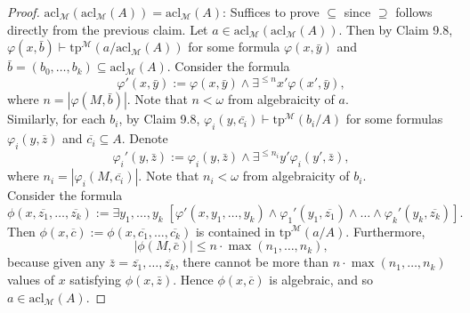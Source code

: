 \documentclass{article}
\begin{document}
\begin{enumerate}[label={\bf Q\arabic*:}]
\begin{proof}
      $\text{acl}_\mathcal{M}(\text{acl}_\mathcal{M}(A))
      =\text{acl}_\mathcal{M}(A)$: Suffices to prove $\subseteq$ since
      $\supseteq$ follows directly from the previous claim. Let
      $a\in\text{acl}_\mathcal{M}(\text{acl}_\mathcal{M}(A))$. Then by
      Claim 9.8, $\varphi(x,\bar{b})\vdash
      \text{tp}^{\mathcal{M}}(a/\text{acl}_\mathcal{M}(A))$ for some
      formula $\varphi(x,\bar{y})$ and $\bar{b}=(b_0,\ldots,b_k)\subseteq
      \text{acl}_\mathcal{M}(A)$. Consider the formula
      \[\varphi'(x,\bar{y}):= \varphi(x,\bar{y})\wedge \exists^{\leq
      n} x'\varphi(x',\bar{y}),\] where
      $n=|\varphi(M,\bar{b})|$. Note that $n<\omega$ from algebraicity of
      $a$. \\

      Similarly, for each $b_i$, by Claim
      9.8, $\varphi_i(y,\bar{c_i})\vdash \text{tp}^{\mathcal{M}}(b_i/A)$
      for some formulas $\varphi_i(y,\overline{z})$ and
      $\overline{c_i}\subseteq A$. Denote
      \[\varphi_i'(y,\bar{z}):= \varphi_i(y,\bar{z})\wedge \exists^{\leq
      n_i} y'\varphi_i(y',\bar{z}),\] where
      $n_i=|\varphi_i(M,\overline{c_i})|$. Note that $n_i<\omega$ from
      algebraicity of $b_i$. \\

      Consider the formula \[\phi(x,\overline{z_1},\ldots,\overline{z_k})
      :=\exists y_1,\ldots,y_k\; \left[\varphi'(x,y_1,\ldots,y_k)
      \wedge\varphi_1'(y_1,\overline{z_1})\wedge\ldots
      \wedge\varphi_k'(y_k,\overline{z_k})\right].\] Then
      $\phi(x,\overline{c}):= \phi(x,\overline{c_1},\ldots,\overline{c_k})$
      is contained in $\text{tp}^{\mathcal{M}}(a/A)$. Furthermore,
      \[|\phi(M,\bar{c})|\leq n\cdot\max(n_1,\ldots,n_k),\] because given
      any $\bar{z}=\overline{z_1},\ldots,\overline{z_k}$, there cannot be
      more than $n\cdot\max(n_1,\ldots,n_k)$ values of $x$ satisfying
      $\phi(x,\bar{z})$. Hence $\phi(x,\overline{c})$ is algebraic, and so
      $a\in\text{acl}_\mathcal{M}(A)$.
    \end{proof}
\end{enumerate}
\end{document}
